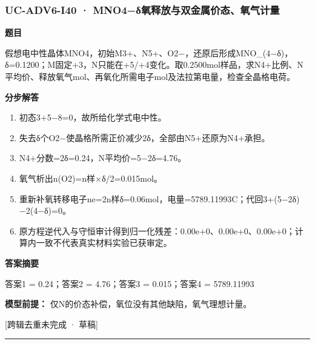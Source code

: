 \documentclass[UTF8,11pt,a4paper]{ctexart}
\begin{document}
\subsubsection*{UC-ADV6-I40 · MNO4−δ氧释放与双金属价态、氧气计量}
\noindent\textbf{题目}\par
假想电中性晶体MNO4，初始M3+、N5+、O2−，还原后形成MNO\_(4−δ)，δ=0.1200；M固定+3，N只能在+5/+4变化。取0.2500mol样品，求N4+比例、N平均价、释放氧气mol、再氧化所需电子mol及法拉第电量，检查全晶格电荷。\par
\medskip\noindent\textbf{分步解答}
\begin{enumerate}
\item 初态3+5−8=0，故所给化学式电中性。
\item 失去δ个O2−使晶格所需正价减少2δ，全部由N5+还原为N4+承担。
\item N4+分数=2δ=0.24，N平均价=5−2δ=4.76。
\item 氧气析出n(O2)=n样×δ/2=0.015mol。
\item 重新补氧转移电子ne=2n样δ=0.06mol，电量=5789.11993C；代回3+(5−2δ)−2(4−δ)=0。
\item 原方程逆代入与守恒审计得到归一化残差：0.00e+0、0.00e+0、0.00e+0；计算内一致不代表真实材料实验已获审定。
\end{enumerate}
\noindent\textbf{答案摘要}\par
答案1 = 0.24；答案2 = 4.76；答案3 = 0.015；答案4 = 5789.11993\par
\noindent\textbf{模型前提：}
仅N的价态补偿，氧位没有其他缺陷，氧气理想计量。\par
\noindent\textcolor{red!65!black}{[跨辑去重未完成 · 草稿]} \par
\medskip\hrule\medskip
{}
\end{document}
